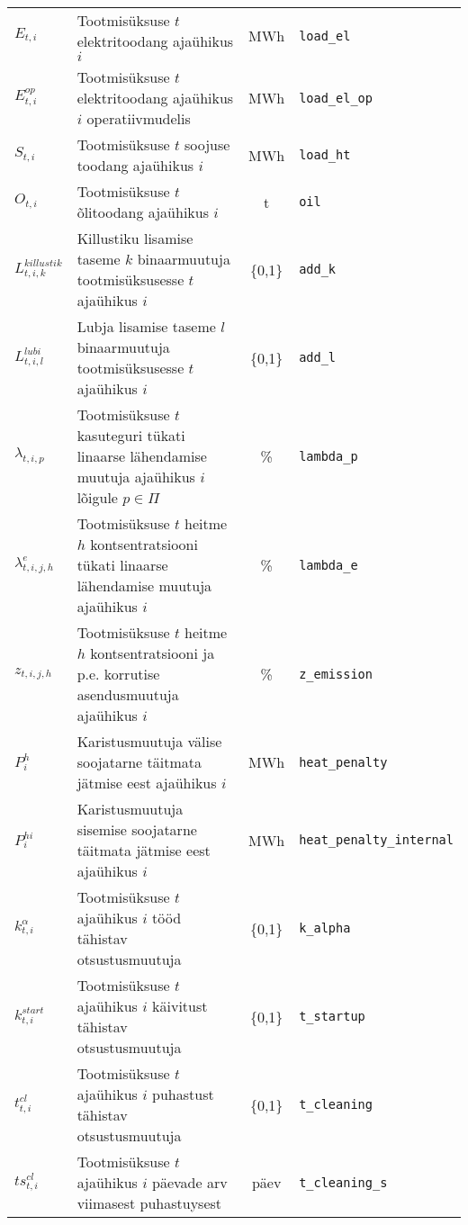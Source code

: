 \begin{landscape}
\begin{longtable}{l l c l}
$E_{t,i}$ & Tootmisüksuse $t$ elektritoodang ajaühikus $i$ & MWh & \texttt{load\_el}\\
$E^{op}_{t,i}$ & Tootmisüksuse $t$ elektritoodang ajaühikus $i$ operatiivmudelis & MWh & \texttt{load\_el\_op}\\
$S_{t,i}$ & Tootmisüksuse $t$ soojuse toodang ajaühikus $i$ & MWh & \texttt{load\_ht}\\
$O_{t,i}$ & Tootmisüksuse $t$ õlitoodang ajaühikus $i$ & t & \texttt{oil}\\
$L^{killustik}_{t,i,k}$ & Killustiku lisamise taseme $k$ binaarmuutuja tootmisüksusesse $t$ ajaühikus $i$ & \{0,1\} & \texttt{add\_k}\\
$L^{lubi}_{t,i,l}$ & Lubja lisamise taseme $l$ binaarmuutuja tootmisüksusesse $t$ ajaühikus $i$ & \{0,1\} & \texttt{add\_l}\\
$\lambda_{t,i,p}$ & Tootmisüksuse $t$ kasuteguri tükati linaarse lähendamise muutuja ajaühikus $i$ lõigule $p\in \Pi$ & \% & \texttt{lambda\_p}\\
$\lambda^e_{t,i,j,h}$ & Tootmisüksuse $t$ heitme $h$ kontsentratsiooni tükati linaarse lähendamise muutuja ajaühikus $i$ & \% & \texttt{lambda\_e}\\
$z_{t,i,j,h}$ & Tootmisüksuse $t$ heitme $h$ kontsentratsiooni ja p.e. korrutise asendusmuutuja ajaühikus $i$ & \% & \texttt{z\_emission}\\

$P^{h}_{i}$ & Karistusmuutuja välise soojatarne täitmata jätmise eest ajaühikus $i$ & MWh & \texttt{heat\_penalty} \\
$P^{hi}_{i}$ & Karistusmuutuja sisemise soojatarne täitmata jätmise eest ajaühikus $i$ & MWh & \texttt{heat\_penalty\_internal} \\

$k^\alpha_{t,i}$ & Tootmisüksuse $t$ ajaühikus $i$ tööd tähistav otsustusmuutuja & \{0,1\} & \texttt{k\_alpha} \\
$k^{start}_{t,i}$ & Tootmisüksuse $t$ ajaühikus $i$ käivitust tähistav otsustusmuutuja & \{0,1\} & \texttt{t\_startup} \\
$t^{cl}_{t,i}$ & Tootmisüksuse $t$ ajaühikus $i$ puhastust tähistav otsustusmuutuja & \{0,1\} & \texttt{t\_cleaning} \\
$ts^{cl}_{t,i}$ & Tootmisüksuse $t$ ajaühikus $i$ päevade arv viimasest puhastuysest & päev & \texttt{t\_cleaning\_s} \\


\end{longtable}
\end{landscape}
